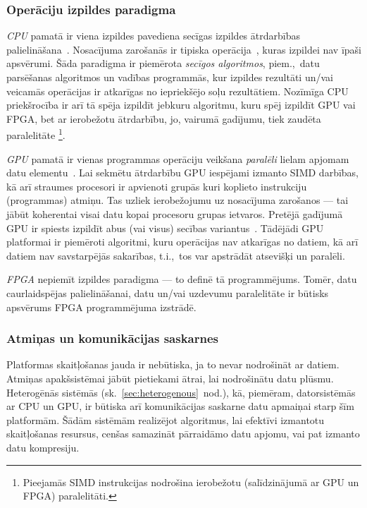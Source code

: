 \subsubsection*{Operāciju izpildes paradigma}
\emph{CPU} pamatā ir viena izpildes pavediena secīgas izpildes ātrdarbības
palielināšana~\cite{Owens-GPU}.
Nosacījuma zarošanās ir tipiska operācija~\cite{Flynn-arch}\cite{Patterson},
kuras izpildei nav īpaši apsvērumi.
Šāda paradigma ir piemērota \emph{secīgos algoritmos},
piem.,~datu parsēšanas algoritmos un vadības programmās,
kur izpildes rezultāti un/vai veicamās operācijas ir atkarīgas
no iepriekšējo soļu rezultātiem. Nozīmīga CPU priekšrocība ir arī tā spēja
izpildīt jebkuru algoritmu, kuru spēj izpildīt GPU vai FPGA, bet ar
ierobežotu ātrdarbību, jo, vairumā gadījumu, tiek zaudēta paralelitāte%
\footnote{Pieejamās SIMD instrukcijas nodrošina
	ierobežotu (salīdzinājumā ar GPU un FPGA) paralelitāti.}.

\emph{GPU} pamatā ir vienas programmas operāciju veikšana \emph{paralēli}
lielam apjomam
datu elementu~\cite{Fatahalian}\cite{Owens-GPU}.
Lai sekmētu ātrdarbību GPU iespējami izmanto SIMD darbības,
kā arī straumes procesori ir apvienoti grupās kuri koplieto instrukciju
(programmas) atmiņu. Tas uzliek ierobežojumu uz nosacījuma zarošanos ---
tai jābūt koherentai visai datu kopai procesoru grupas ietvaros. Pretējā
gadījumā GPU ir spiests izpildīt abus (vai visus) secības variantus~\cite{Owens-GPU}.
Tādējādi GPU platformai ir piemēroti algoritmi, kuru operācijas nav atkarīgas no datiem,
kā arī datiem nav savstarpējās sakarības, t.i.,~tos var apstrādāt atsevišķi
un paralēli.

\emph{FPGA} nepiemīt izpildes paradigma --- to definē tā programmējums.
Tomēr, datu caurlaidspējas palielināšanai,
datu un/vai uzdevumu paralelitāte ir būtisks apsvērums
FPGA programmējuma izstrādē.

\subsubsection*{Atmiņas un komunikācijas saskarnes}
Platformas skaitļošanas jauda ir nebūtiska, ja to nevar nodrošināt ar datiem.
Atmiņas apakšsistēmai jābūt pietiekami ātrai, lai nodrošinātu datu plūsmu.
Heterogēnās sistēmās (sk.~\ref{sec:heterogenous}~nod.), kā, piemēram,
datorsistēmās ar CPU un GPU, ir būtiska arī komunikācijas saskarne datu
apmaiņai starp šīm platformām. Šādām sistēmām realizējot algoritmus,
lai efektīvi izmantotu skaitļošanas resursus, cenšas samazināt pārraidāmo
datu apjomu, vai pat izmanto datu kompresiju.
\cite{ACDA}\cite{OpenCL-book}

